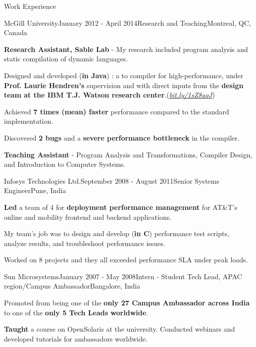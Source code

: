 \documentclass{resume} %
\begin{document}
\begin{rSection}{Work Experience}
\begin{rSubsection}{McGill University}{January 2012 - April 2014}{Research and
Teaching}{Montreal, QC, Canada} 
\item \textbf{Research Assistant, Sable Lab} - My research included program
analysis and static compilation of dynamic languages.

\begin{lsubSubsection}
\item Designed and developed (\textbf{in Java}) \mixtenx: a \matlab to
\xten  compiler for high-performance, under \textbf{Prof.
Laurie Hendren's} supervision and with direct inputs from the \textbf{\xten
design team at the IBM T.J. Watson research
center}.(\href{http://bit.ly/1sZ8aqJ}{\em{bit.ly/1sZ8aqJ}})  
 \item Achieved \textbf{7 times (mean) faster} performance compared to the
 standard \matlab implementation.
  \item Discovered \textbf{2 bugs} and a \textbf{severe performance bottleneck}
in the \xten compiler.  
\end{lsubSubsection}
\item \textbf{Teaching Assistant} - Program Analysis and Transformations,
	Compiler Design, and Introduction to Computer Systems.
\end{rSubsection}

\begin{rSubsection}{Infosys Technologies Ltd.}{September 2008 - August
2011}{Senior Systems Engineer}{Pune, India}
\item \textbf{Led} a team of 4 for \textbf{deployment performance management}
for AT\&T's online and mobility frontend and backend applications.
\begin{lsubSubsection}
\item My team's job was to design and develop (\textbf{in C}) performance
test scripts, analyze results, and troubleshoot performance issues.  
\item {Worked on 8 projects} and they all exceeded performance SLA under
peak loads.
\end{lsubSubsection}
\end{rSubsection}

\begin{rSubsection}{Sun Microsystems}{January 2007 - May 2008}{Intern - Student
Tech Lead, APAC region/Campus Ambassador}{Bangalore, India}
\item Promoted from being one of the \textbf{only 27 Campus Ambassador across India}
to one of the \textbf{only 5 Tech Leads worldwide}.  
\begin{lsubSubsection}
\item \textbf{Taught} a course on OpenSolaris at the university. Conducted
webinars and developed tutorials for ambassadors worldwide.
\end{lsubSubsection}
\end{rSubsection}
\end{rSection}
\end{document}
